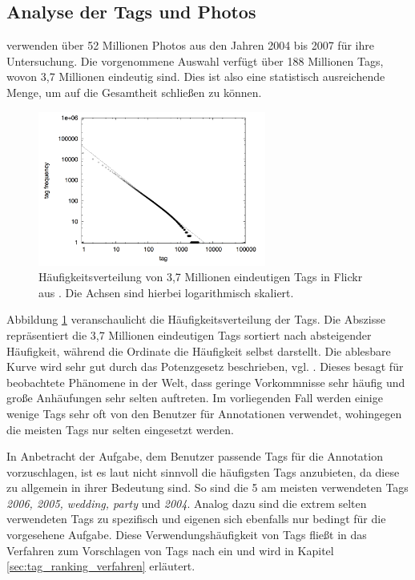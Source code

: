 \subsection{Analyse der Tags und Photos} %
\label{sub:analyse_der_tags}

\cite{collectiveKnowledge} verwenden über 52 Millionen Photos aus den Jahren 2004 bis 2007 für ihre Untersuchung. Die vorgenommene Auswahl verfügt über 188 Millionen Tags, wovon 3,7 Millionen eindeutig sind. Dies ist also eine statistisch ausreichende Menge, um auf die Gesamtheit schließen zu können.

\begin{figure}[htbp]
    \centering
      \includegraphics[height=2in]{images/collectiveKnowledge_tag_frequency.png}
    \caption{Häufigkeitsverteilung von 3,7 Millionen eindeutigen Tags in Flickr aus \cite{collectiveKnowledge}. Die Achsen sind hierbei logarithmisch skaliert.}
    \label{fig:images_collectiveKnowledge_word_net_categories}
\end{figure}

Abbildung \ref{fig:images_collectiveKnowledge_word_net_categories} veranschaulicht die Häufigkeitsverteilung der Tags. Die Abszisse repräsentiert die 3,7 Millionen eindeutigen Tags sortiert nach absteigender Häufigkeit, während die Ordinate die Häufigkeit selbst darstellt. Die ablesbare Kurve wird sehr gut durch das Potenzgesetz  beschrieben, vgl. \cite{hpParetoPowerLaw}. Dieses besagt für beobachtete Phänomene in der Welt, dass geringe Vorkommnisse sehr häufig und große Anhäufungen sehr selten auftreten. Im vorliegenden Fall werden einige wenige Tags sehr oft von den Benutzer für Annotationen verwendet, wohingegen die meisten Tags nur selten eingesetzt werden.

In Anbetracht der Aufgabe, dem Benutzer passende Tags für die Annotation vorzuschlagen, ist es laut \cite{collectiveKnowledge} nicht sinnvoll die häufigsten Tags anzubieten, da diese zu allgemein in ihrer Bedeutung sind. So sind die 5 am meisten verwendeten Tags \emph{2006, 2005, wedding, party} und \emph{2004}. Analog dazu sind die extrem selten verwendeten Tags zu spezifisch und eigenen sich ebenfalls nur bedingt für die vorgesehene Aufgabe. Diese Verwendungshäufigkeit von Tags fließt in das Verfahren zum Vorschlagen von Tags nach \cite{collectiveKnowledge} ein und wird in Kapitel \ref{sec:tag_ranking_verfahren} erläutert.


